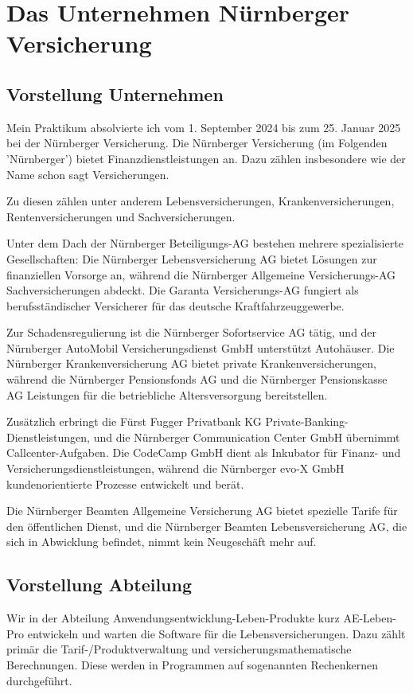 \chapter{Das Unternehmen Nürnberger Versicherung}\label{ch:intro}


\section{Vorstellung Unternehmen}
Mein Praktikum absolvierte ich vom 1. September 2024 bis zum 25. Januar 2025 bei der Nürnberger Versicherung.
Die Nürnberger Versicherung (im Folgenden 'Nürnberger') bietet Finanzdienstleistungen an.
Dazu zählen insbesondere wie der Name schon sagt Versicherungen.


Zu diesen zählen unter anderem Lebensversicherungen, Krankenversicherungen, Rentenversicherungen und Sachversicherungen.

Unter dem Dach der Nürnberger Beteiligungs-AG bestehen mehrere spezialisierte Gesellschaften: Die Nürnberger Lebensversicherung AG bietet Lösungen zur finanziellen Vorsorge an, während die Nürnberger Allgemeine Versicherungs-AG Sachversicherungen abdeckt. Die Garanta Versicherungs-AG fungiert als berufsständischer Versicherer für das deutsche Kraftfahrzeuggewerbe.

Zur Schadensregulierung ist die Nürnberger Sofortservice AG tätig, und der Nürnberger AutoMobil Versicherungsdienst GmbH unterstützt Autohäuser. Die Nürnberger Krankenversicherung AG bietet private Krankenversicherungen, während die Nürnberger Pensionsfonds AG und die Nürnberger Pensionskasse AG Leistungen für die betriebliche Altersversorgung bereitstellen.

Zusätzlich erbringt die Fürst Fugger Privatbank KG Private-Banking-Dienst\-leistungen, und die Nürnberger Communication Center GmbH übernimmt Call\-center-Aufgaben. 
Die CodeCamp GmbH dient als Inkubator für Finanz- und Versicherungsdienstleistungen, während die Nürnberger evo-X GmbH kundenorientierte Prozesse entwickelt und berät.

Die Nürnberger Beamten Allgemeine Versicherung AG bietet spezielle Tarife für den öffentlichen Dienst, und die Nürnberger Beamten Lebensversicherung AG, die sich in Abwicklung befindet, nimmt kein Neugeschäft mehr auf.\cite{NürnbergerWiki2024}
\section{Vorstellung Abteilung}
Wir in der Abteilung Anwendungsentwicklung-Leben-Produkte kurz AE-Leben-Pro entwickeln und warten die Software für die Lebensversicherungen.
Dazu zählt primär die Tarif-/Produktverwaltung und versicherungsmathematische Berechnungen. 
Diese werden in Programmen auf sogenannten Rechenkernen durchgeführt.

